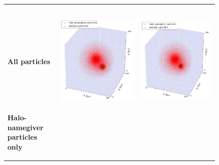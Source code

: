 \begin{subfigures}
\begin{figure}[!htbp]
{		}
	\end{figure}
	\begin{figure}[!htbp]%
		{
		\renewcommand{\arraystretch}{0.1}
		\centering	
		\begin{tabular}{|p{.5cm} c c|}
			\hline
			&&\\[1em]
			&	\neigh\ 	& \iter \\[1.5em]
			\begin{sideways}{\hspace{3cm} \textbf{All particles}}\end{sideways} \hspace*{-1em}	&		 
			{\includegraphics[width = .42\textwidth]{images/dice-two/dice-two-plot-halo1451-saddle.png}} \hspace*{-1em} 	& 
			{\includegraphics[width = .42\textwidth]{images/dice-two/dice-two-plot-halo1451-iter.png}} \hspace*{-1em}	\\
			\begin{sideways}{ \hspace{.5cm}\textbf{Halo-namegiver particles only} }\end{sideways}	 \hspace*{-1em}			 &			 

\end{tabular}}
\end{figure}
\end{subfigures}
